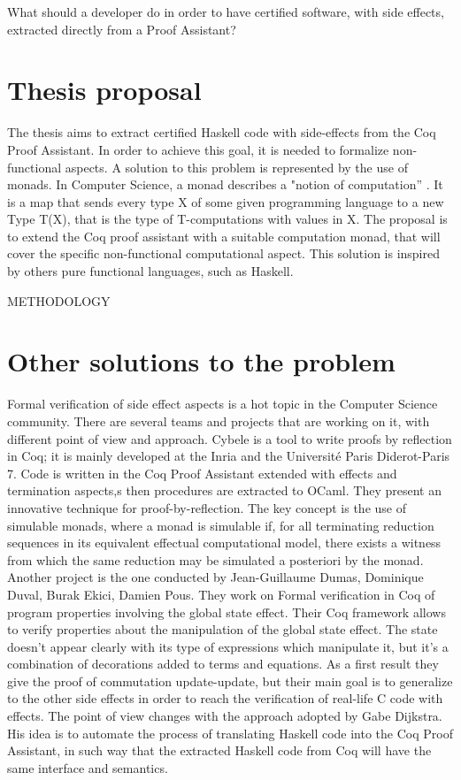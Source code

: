 \documentclass[target=mst,babel=\babelopt]{thud}[2014/01/17]
\begin{document}
 What should a developer do in order to have certified software, with
 side effects, extracted directly from a Proof Assistant?

\section{Thesis proposal}
The thesis aims to extract certified Haskell code with side-effects
from the Coq Proof Assistant. In order to achieve this goal, it is 
needed to formalize non-functional aspects. A solution to this problem
is represented by the use of monads.
In Computer Science, a monad describes a "notion of computation''
\cite{Moggi91}. It
is a map that sends every type X of some given programming language to
a new Type T(X), that is the type of T-computations with values in X. 
The proposal is to extend the Coq proof assistant with a
suitable computation monad, that will cover the specific
non-functional computational aspect. This solution is inspired by
others pure functional languages, such as Haskell.

METHODOLOGY

\section{Other solutions to the problem}
Formal verification of side effect aspects is a hot topic in the
Computer Science community. There are several teams and projects that
are working on it, with different point of view and approach.
Cybele\cite{Cybele} is a tool to write proofs by reflection in Coq;
it is mainly developed at the Inria and the Université Paris Diderot-Paris 7.
Code is written in the Coq Proof Assistant extended with effects and
termination aspects,s then procedures are extracted to OCaml. They
present an innovative technique for proof-by-reflection. The key
concept is the use of simulable monads, where a monad
is simulable if, for all terminating reduction sequences in its equivalent
effectual computational model, there exists a witness from which the same
reduction may be simulated a posteriori by the
monad.\cite{claret:hal-00870110}
Another project is the one conducted by Jean-Guillaume Dumas, 
Dominique Duval, Burak Ekici, Damien Pous. They work on Formal
verification in Coq of program properties involving the global state
effect. \cite{Dumas:2014:coqstates} Their Coq framework allows to
verify properties about the manipulation of the global state
effect. The state doesn't appear clearly with its type of expressions
which manipulate it, but it's a combination of decorations added to terms and
equations. As a first result they give the proof of commutation
update-update,  but their main goal is to generalize to the other
side effects in order to reach the verification of real-life C code with effects.
The point of view changes with the approach adopted by Gabe
Dijkstra.\cite{Dijkstra12} His idea is to automate the process of
translating Haskell code into the Coq Proof Assistant, in such way
that the extracted Haskell code from Coq will have the same interface
and semantics.  
\end{document}

